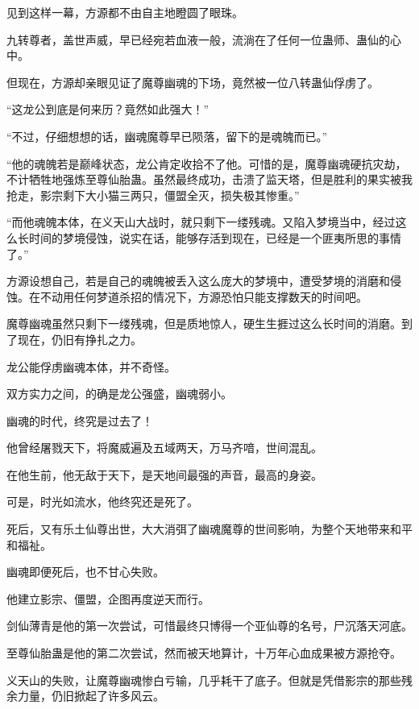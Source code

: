 
\begin{this_body}



见到这样一幕，方源都不由自主地瞪圆了眼珠。

九转尊者，盖世声威，早已经宛若血液一般，流淌在了任何一位蛊师、蛊仙的心中。

但现在，方源却亲眼见证了魔尊幽魂的下场，竟然被一位八转蛊仙俘虏了。

“这龙公到底是何来历？竟然如此强大！”

“不过，仔细想想的话，幽魂魔尊早已陨落，留下的是魂魄而已。”

“他的魂魄若是巅峰状态，龙公肯定收拾不了他。可惜的是，魔尊幽魂硬抗灾劫，不计牺牲地强炼至尊仙胎蛊。虽然最终成功，击溃了监天塔，但是胜利的果实被我抢走，影宗剩下大小猫三两只，僵盟全灭，损失极其惨重。”

“而他魂魄本体，在义天山大战时，就只剩下一缕残魂。又陷入梦境当中，经过这么长时间的梦境侵蚀，说实在话，能够存活到现在，已经是一个匪夷所思的事情了。”

方源设想自己，若是自己的魂魄被丢入这么庞大的梦境中，遭受梦境的消磨和侵蚀。在不动用任何梦道杀招的情况下，方源恐怕只能支撑数天的时间吧。

魔尊幽魂虽然只剩下一缕残魂，但是质地惊人，硬生生捱过这么长时间的消磨。到了现在，仍旧有挣扎之力。

龙公能俘虏幽魂本体，并不奇怪。

双方实力之间，的确是龙公强盛，幽魂弱小。

幽魂的时代，终究是过去了！

他曾经屠戮天下，将魔威遍及五域两天，万马齐喑，世间混乱。

在他生前，他无敌于天下，是天地间最强的声音，最高的身姿。

可是，时光如流水，他终究还是死了。

死后，又有乐土仙尊出世，大大消弭了幽魂魔尊的世间影响，为整个天地带来和平和福祉。

幽魂即便死后，也不甘心失败。

他建立影宗、僵盟，企图再度逆天而行。

剑仙薄青是他的第一次尝试，可惜最终只博得一个亚仙尊的名号，尸沉落天河底。

至尊仙胎蛊是他的第二次尝试，然而被天地算计，十万年心血成果被方源抢夺。

义天山的失败，让魔尊幽魂惨白亏输，几乎耗干了底子。但就是凭借影宗的那些残余力量，仍旧掀起了许多风云。


\end{this_body}
